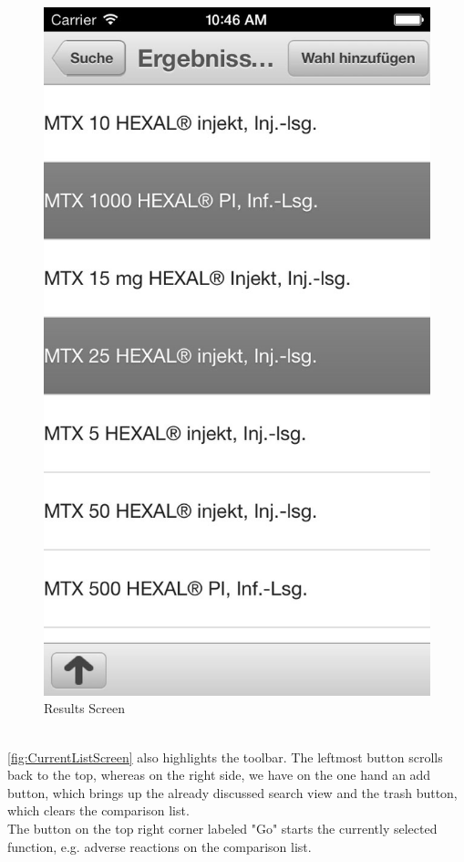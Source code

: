 \begin{figure}[!b]
\begin{minipage}[b]{0.45\linewidth}
        \includegraphics[width=0.8025\linewidth]{figures/Results_Alt_bw.jpg}
        \caption[List Screen to add to Comparison List]{Results Screen}
        \label{fig:AlternativeListScreen}
    \end{minipage}
\end{figure}
\\
\ref{fig:CurrentListScreen} also highlights the toolbar. The leftmost button scrolls back to the top, whereas on the right side, we have on the one hand an add button, which brings up the already discussed search view and the trash button, which clears the comparison list. 
\\
The button on the top right corner labeled "Go" starts the currently selected function, e.g. adverse reactions on the comparison list.
\\
